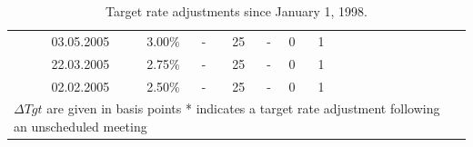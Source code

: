 \documentclass[11pt,a4paper,english,oneside]{book}
\numberwithin{equation}{chapter}
\begin{document}
\begin{table}
\begin{tabular}{r r r r r c c | r r r r r c c }
		03.05.2005 & 3.00\% &   -    & 25  &  -   & 0 & 1 &            &      &  &     &  &   &   \\
		22.03.2005 & 2.75\% &   -    & 25  &  -   & 0 & 1 &            &      &  &     &  &   &   \\
		02.02.2005 & 2.50\% &   -    & 25  &  -   & 0 & 1 &            &      &  &     &  &   & \\	
		\midrule																
		\multicolumn{13}{l}{ $\Delta Tgt$ are given in basis points \hspace{1cm}  * indicates a target rate adjustment following an unscheduled meeting} & \\
		\bottomrule %
	\end{tabular}
	\caption{Target rate adjustments since January 1, 1998.} %
	\label{tab:target} %
\end{table}

\newpage
\thispagestyle{firststyle}
\end{document}
